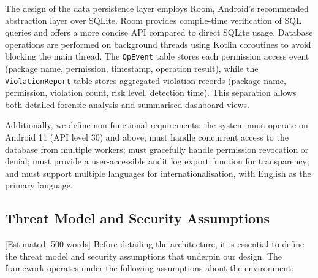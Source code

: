 The design of the data persistence layer employs Room, Android's recommended abstraction layer over SQLite. Room provides compile-time verification of SQL queries and offers a more concise API compared to direct SQLite usage. Database operations are performed on background threads using Kotlin coroutines to avoid blocking the main thread. The \texttt{OpEvent} table stores each permission access event (package name, permission, timestamp, operation result), while the \texttt{ViolationReport} table stores aggregated violation records (package name, permission, violation count, risk level, detection time). This separation allows both detailed forensic analysis and summarised dashboard views.

Additionally, we define non-functional requirements: the system must operate on Android 11 (API level 30) and above; must handle concurrent access to the database from multiple workers; must gracefully handle permission revocation or denial; must provide a user-accessible audit log export function for transparency; and must support multiple languages for internationalisation, with English as the primary language.

\subsection{Threat Model and Security Assumptions} [Estimated: 500 words]
Before detailing the architecture, it is essential to define the threat model and security assumptions that underpin our design. The framework operates under the following assumptions about the environment:

